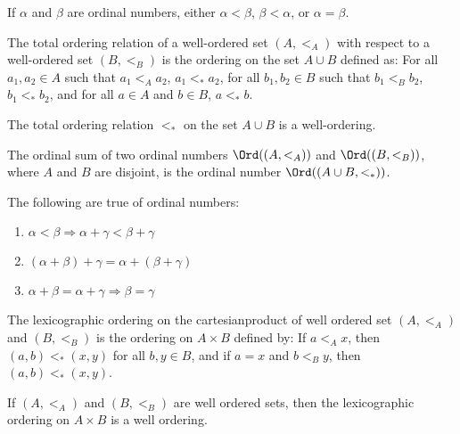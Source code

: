     \begin{theorem}
        If $\alpha$ and $\beta$ are ordinal numbers, either
        $\alpha<\beta$, $\beta<\alpha$, or $\alpha=\beta$.
    \end{theorem}
    \begin{definition}
        The total ordering relation of a well-ordered set $(A,<_{A})$
        with respect
       to a well-ordered set $(B,<_{B})$ is the ordering
       on the set ${A}\cup{B}$ defined as: For all
       $a_{1},a_{2}\in{A}$ such that $a_{1}<_{A}a_{2}$,
       $a_{1}<_{*}a_{2}$, for all $b_{1},b_{2}\in{B}$
       such that $b_{1}<_{B}b_{2}$, $b_{1}<_{*}b_{2}$,
       and for all ${a}\in{A}$ and ${b}\in{B}$,
       ${a}<_{*}{b}$.
    \end{definition}
    \begin{theorem}
       The total ordering relation $<_{*}$ on the set
       ${A}\cup{B}$ is a well-ordering.
    \end{theorem}
    \begin{definition}
        The ordinal sum of two ordinal numbers $\Ord((A,<_{A}))$ and
        $\Ord((B,<_{B}))$, where $A$ and $B$ are disjoint, is the ordinal
        number $\Ord(({A}\cup{B},<_{*}))$.
    \end{definition}
    \begin{theorem}
       The following are true of ordinal numbers:
       \begin{enumerate}
            \item $\alpha<\beta\Rightarrow\alpha+\gamma<\beta+\gamma$
            \item $(\alpha+\beta)+\gamma=\alpha+(\beta+\gamma)$
            \item $\alpha+\beta=\alpha+\gamma\Rightarrow\beta=\gamma$
       \end{enumerate}
    \end{theorem}
    \begin{definition}
        The lexicographic ordering on the cartesianproduct of well
        ordered set $(A,<_{A})$ and $(B,<_{B})$ is the ordering on
        ${A}\times{B}$ defined by: If ${a}<_{A}{x}$, then
        $(a,b)<_{*}(x,y)$ for all $b,y\in{B}$, and if $a=x$ and
        $b<_{B}y$, then $(a,b)<_{*}(x,y)$.
    \end{definition}
    \begin{theorem}
        If $(A,<_{A})$ and $(B,<_{B})$ are well ordered sets, then the
        lexicographic ordering on ${A}\times{B}$ is a well ordering.
    \end{theorem}
